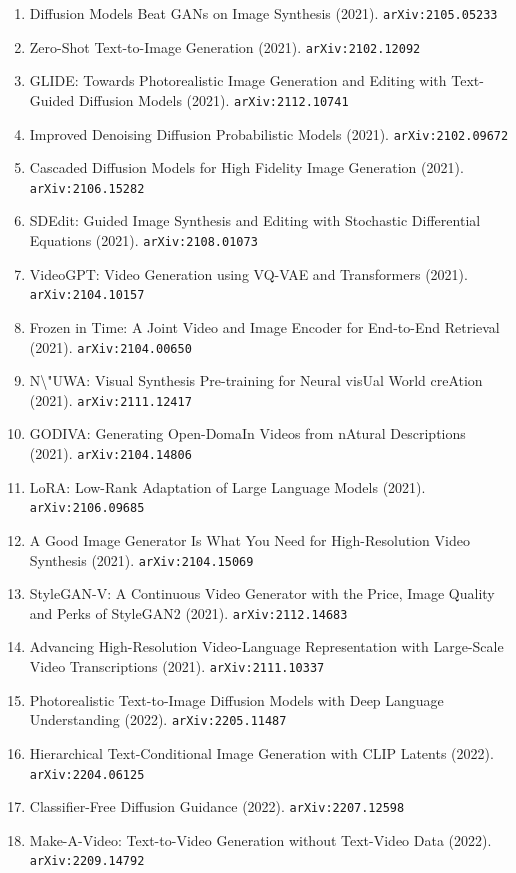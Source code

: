 \documentclass[11pt]{article}
\begin{document}
\begin{enumerate}
  \item Diffusion Models Beat GANs on Image Synthesis (2021). \texttt{arXiv:2105.05233}
  \item Zero-Shot Text-to-Image Generation (2021). \texttt{arXiv:2102.12092}
  \item GLIDE: Towards Photorealistic Image Generation and Editing with
  Text-Guided Diffusion Models (2021). \texttt{arXiv:2112.10741}
  \item Improved Denoising Diffusion Probabilistic Models (2021). \texttt{arXiv:2102.09672}
  \item Cascaded Diffusion Models for High Fidelity Image Generation (2021). \texttt{arXiv:2106.15282}
  \item SDEdit: Guided Image Synthesis and Editing with Stochastic Differential
  Equations (2021). \texttt{arXiv:2108.01073}
  \item VideoGPT: Video Generation using VQ-VAE and Transformers (2021). \texttt{arXiv:2104.10157}
  \item Frozen in Time: A Joint Video and Image Encoder for End-to-End Retrieval (2021). \texttt{arXiv:2104.00650}
  \item N\textbackslash{}"UWA: Visual Synthesis Pre-training for Neural visUal World creAtion (2021). \texttt{arXiv:2111.12417}
  \item GODIVA: Generating Open-DomaIn Videos from nAtural Descriptions (2021). \texttt{arXiv:2104.14806}
  \item LoRA: Low-Rank Adaptation of Large Language Models (2021). \texttt{arXiv:2106.09685}
  \item A Good Image Generator Is What You Need for High-Resolution Video
  Synthesis (2021). \texttt{arXiv:2104.15069}
  \item StyleGAN-V: A Continuous Video Generator with the Price, Image Quality
  and Perks of StyleGAN2 (2021). \texttt{arXiv:2112.14683}
  \item Advancing High-Resolution Video-Language Representation with Large-Scale
  Video Transcriptions (2021). \texttt{arXiv:2111.10337}
  \item Photorealistic Text-to-Image Diffusion Models with Deep Language
  Understanding (2022). \texttt{arXiv:2205.11487}
  \item Hierarchical Text-Conditional Image Generation with CLIP Latents (2022). \texttt{arXiv:2204.06125}
  \item Classifier-Free Diffusion Guidance (2022). \texttt{arXiv:2207.12598}
  \item Make-A-Video: Text-to-Video Generation without Text-Video Data (2022). \texttt{arXiv:2209.14792}

\end{enumerate}
\end{document}

